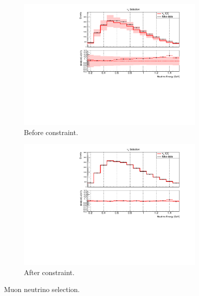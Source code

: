 \begin{figure}[H] 
\begin{center}
    \begin{subfigure}[b]{0.45\textwidth}
    \centering
    \includegraphics[width=1.00\textwidth]{Fakedata/set3/nue_numu_reco_e_H1_mc_fakedata_set3_numu_before_data_constraint.pdf}
    \caption{\label{fig:fakedata:set3:numu_before_constrain} Before constraint.}
    \end{subfigure}
    \begin{subfigure}[b]{0.45\textwidth}
    \centering
    \includegraphics[width=1.00\textwidth]{Fakedata/set3/nue_numu_reco_e_H1_mc_fakedata_set3_scaled_numu.pdf}
    \caption{\label{fig:fakedata:set3:numu_after_constrain} After constraint.}
    \end{subfigure}
\caption{\label{fig:fakedata:set3:numu_const} Muon neutrino selection.}
\end{center}
\end{figure}

